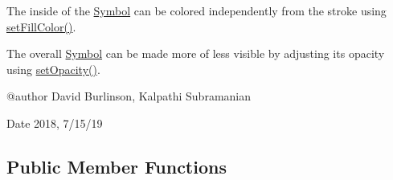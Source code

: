 The inside of the \hyperlink{classbridges_1_1base_1_1_symbol}{Symbol} can be colored independently from the stroke using \hyperlink{classbridges_1_1base_1_1_symbol_a850688e5157674aee916fef6cd9e0b8c}{set\+Fill\+Color()}.

The overall \hyperlink{classbridges_1_1base_1_1_symbol}{Symbol} can be made more of less visible by adjusting its opacity using \hyperlink{classbridges_1_1base_1_1_symbol_abac237b439448cbef3744817d14061c5}{set\+Opacity()}. \begin{DoxyVerb}@author David Burlinson, Kalpathi Subramanian
\end{DoxyVerb}


\begin{DoxyDate}{Date}
2018, 7/15/19 
\end{DoxyDate}
\subsection*{Public Member Functions}
